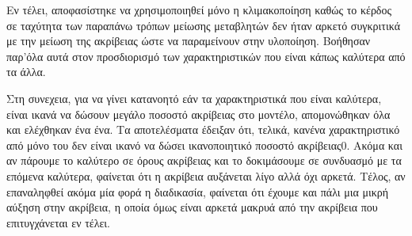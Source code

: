 Εν τέλει, αποφασίστηκε να χρησιμοποιηθεί μόνο η κλιμακοποίηση καθώς το κέρδος σε ταχύτητα των παραπάνω τρόπων μείωσης μεταβλητών δεν ήταν αρκετό συγκριτικά με την μείωση της ακρίβειας ώστε να παραμείνουν στην υλοποίηση. Βοήθησαν παρ'όλα αυτά στον προσδιορισμό των χαρακτηριστικών που είναι κάπως καλύτερα από τα άλλα.



Στη συνεχεια, για να γίνει κατανοητό εάν τα χαρακτηριστικά που είναι καλύτερα, είναι ικανά να δώσουν μεγάλο ποσοστό ακρίβειας στο μοντέλο, απομονώθηκαν όλα και ελέχθηκαν ένα ένα. 
Tα αποτελέσματα έδειξαν ότι, τελικά, κανένα χαρακτηριστικό από μόνο του δεν είναι ικανό να δώσει ικανοποιητικό ποσοστό ακρίβειας0. Ακόμα και αν πάρουμε το καλύτερο σε όρους ακρίβειας και το δοκιμάσουμε σε συνδυασμό με τα επόμενα καλύτερα, φαίνεται ότι η ακρίβεια αυξάνεται λίγο αλλά όχι αρκετά.  
Τέλος, αν επαναληφθεί ακόμα μία φορά η διαδικασία, φαίνεται ότι έχουμε και πάλι μια μικρή αύξηση στην ακρίβεια, η οποία όμως είναι αρκετά μακρυά από την ακρίβεια που επιτυγχάνεται εν τέλει. 

